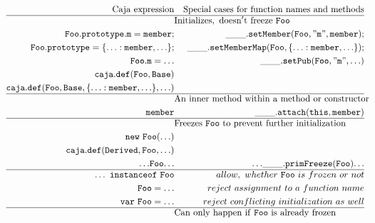 \documentclass[letterpaper,twocolumn,10pt]{article}
\newcommand{\code}[1]{{\tt {#1}}}              %
\begin{document}
\begin{figure}
\begin{eqnarray}
  \mathrm{Caja\ expression}         & \nonumber & \mathrm{Special\ cases\ for\ function\ names\ and\ methods} \\ 
  \hline
  \nonumber & \lefteqn{\mathrm{Initializes,\ doesn't\ freeze\ \code{Foo}}} & \\
  \code{Foo.prototype.m = member;}  & \label{set:member} & \code{\_\_\_.setMember(Foo, "m", member);} \\
  \code{Foo.prototype = \{\ldots:member,{\ldots}\};} 
                            & \label{set:member-map} & \code{\_\_\_.setMemberMap(Foo,\{\ldots:member,{\ldots}\});} \\
  \code{Foo.m = \ldots}     & \label{set:static}     & \code{\_\_\_.setPub(Foo, "m", \ldots)} \\
  \code{caja.def(Foo,Base)} & \label{call:caja-def}  & \\
  \code{caja.def(Foo,Base,\{\ldots:member,{\ldots}\},\ldots)} 
                            & \nonumber              & \\
  \hline
  \nonumber                 & \lefteqn{\mathrm{An\ inner\ method\ within\ a\ method\ or\ constructor}} & \\
  \code{member}             & \label{func:attached-method} & \code{\_\_\_.attach(this,member)} \\
  \hline
 \nonumber & \lefteqn{\mathrm{Freezes\ \code{Foo}\ to\ prevent\ further\ initialization}} & \\ 
  \code{new\ Foo(\ldots)}   & \label{new:ctor-freeze}      & \\ 
  \code{caja.def(Derived,Foo,\ldots)} & \nonumber          & \\
  \code{{\ldots} Foo {\ldots}} & \label{var:func-name}     & \code{{\ldots} \_\_\_.primFreeze(Foo) {\ldots}} \\
  \hline
  \code{\ldots\ instanceof\ Foo} & \label{instanceof}      & allow,\ whether\ \code{Foo}\ is\ frozen\ or\ not\\ 
  \code{Foo = \ldots}        & \label{set:bad-func-assign} & reject\ assignment\ to\ a\ function\ name \\
  \code{var\ Foo = \ldots}   & \label{set:bad-func-init}   & reject\ conflicting\ initialization\ as\ well \\ 
  \hline
 \nonumber & \lefteqn{\mathrm{Can\ only\ happen\ if\ \code{Foo}\ is\ already\ frozen}} & \\ 

\end{eqnarray}
\end{figure}
\end{document}
